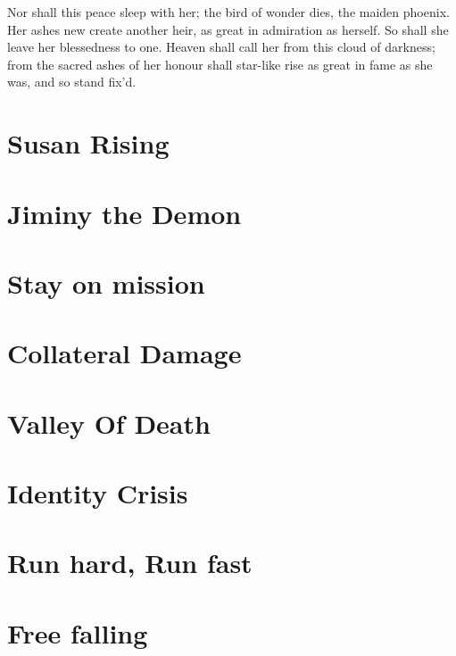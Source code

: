 \documentclass[12pt,twoside,onecolumn,openright,extrafontsizes]{memoir}
\newcommand*\NewPage{\newpage\thispagestyle{empty}\mbox{}}
\begin{document}
\begin{center}
\itshape
{
	\noindent
	{
		Nor shall this peace sleep with her; the bird of wonder dies, the maiden phoenix. Her ashes new create another heir, as great in admiration as herself. So shall she leave her blessedness to one. Heaven shall call her from this cloud of darkness; from the sacred ashes of her honour shall star-like rise as great in fame as she was, and so stand fix'd.\\
		\medskip
		
	}
}
\end{center}

%
%
%
%
	\frontmatter
	\pagestyle{mystyle}
%

%
%
%
%
%


\clearpage
\tableofcontents*

\mainmatter
\chapter{Susan Rising}

\chapter{Jiminy the Demon}

\chapter{Stay on mission}

\chapter{Collateral Damage}

\chapter{Valley Of Death}

\chapter{Identity Crisis}

\chapter{Run hard, Run fast}

\chapter{Free falling}

\end{document}
